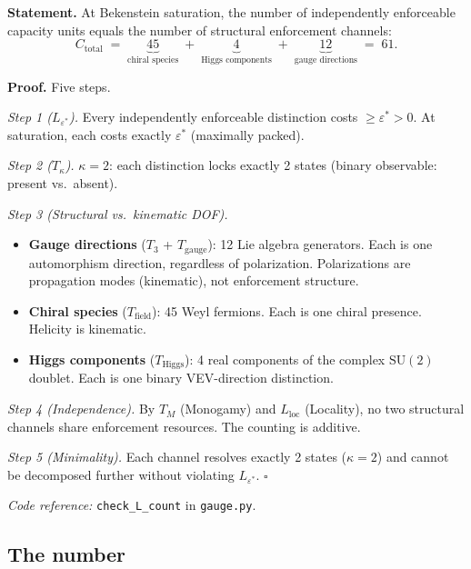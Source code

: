 \documentclass[11pt]{article}
\newenvironment{varlist}{\begin{itemize}[nosep,leftmargin=2em]}{\end{itemize}}
\newcommand{\coderef}[2]{\smallskip\noindent\textit{Code reference:} \texttt{#1} in \texttt{#2}.}
\newcommand{\SU}{\mathrm{SU}}
\begin{document}
\begin{tcolorbox}[apfbox, title={Lemma $L_{\mathrm{count}}$ (Capacity Counting)}]
\textbf{Statement.}  At Bekenstein saturation, the number of independently enforceable capacity units equals the number of structural enforcement channels:
\begin{equation}
C_{\mathrm{total}} \;=\; \underbrace{45}_{\text{chiral species}} \;+\; \underbrace{4}_{\text{Higgs components}} \;+\; \underbrace{12}_{\text{gauge directions}} \;=\; 61.
\label{eq:ctotal}
\end{equation}

\smallskip\noindent\textbf{Proof.}  Five steps.

\textit{Step 1 ($L_{\varepsilon^*}$).}  Every independently enforceable distinction costs $\ge \varepsilon^* > 0$.  At saturation, each costs exactly $\varepsilon^*$ (maximally packed).

\textit{Step 2 ($T_\kappa$).}  $\kappa = 2$: each distinction locks exactly 2 states (binary observable: present vs.\ absent).

\textit{Step 3 (Structural vs.\ kinematic DOF).}
\begin{varlist}
\item \textbf{Gauge directions} ($T_3$ + $T_{\mathrm{gauge}}$): 12 Lie algebra generators.  Each is one automorphism direction, regardless of polarization.  Polarizations are propagation modes (kinematic), not enforcement structure.
\item \textbf{Chiral species} ($T_{\mathrm{field}}$): 45 Weyl fermions.  Each is one chiral presence.  Helicity is kinematic.
\item \textbf{Higgs components} ($T_{\mathrm{Higgs}}$): 4 real components of the complex $\SU(2)$ doublet.  Each is one binary VEV-direction distinction.
\end{varlist}

\textit{Step 4 (Independence).}  By $T_M$ (Monogamy) and $L_{\mathrm{loc}}$ (Locality), no two structural channels share enforcement resources.  The counting is additive.

\textit{Step 5 (Minimality).}  Each channel resolves exactly 2 states ($\kappa = 2$) and cannot be decomposed further without violating $L_{\varepsilon^*}$.  $\square$

\coderef{check\_L\_count}{gauge.py}
\end{tcolorbox}

\subsection{The number}
\end{document}
